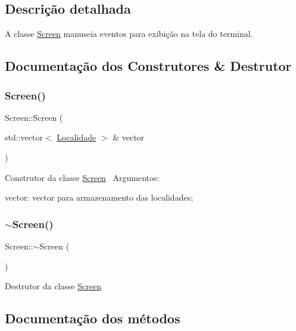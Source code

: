 \subsection{Descrição detalhada}
A classe \hyperlink{classScreen}{Screen} manuseia eventos para exibição na tela do terminal. 

\subsection{Documentação dos Construtores \& Destrutor}
\mbox{\label{classScreen_ac7905724062398213802167f49dbe682}} 
\subsubsection{\texorpdfstring{Screen()}{Screen()}}
{\footnotesize\ttfamily Screen\+::\+Screen (\begin{DoxyParamCaption}\item[{std\+::vector$<$ \hyperlink{classLocalidade}{Localidade} $>$ \&}]{vector }\end{DoxyParamCaption})}

Construtor da classe \hyperlink{classScreen}{Screen}~\newline
Argumentos\+:
\begin{DoxyItemize}
\item vector\+: vector para armazenamento das localidades;
\end{DoxyItemize}\mbox{\label{classScreen_a4243bc17596af96415b09ac48205676d}} 
\subsubsection{\texorpdfstring{$\sim$\+Screen()}{~Screen()}}
{\footnotesize\ttfamily Screen\+::$\sim$\+Screen (\begin{DoxyParamCaption}{ }\end{DoxyParamCaption})}

Destrutor da classe \hyperlink{classScreen}{Screen}

\subsection{Documentação dos métodos}
\mbox{\label{classScreen_a32771ff2a19f570bf35654e11971e938}} 
